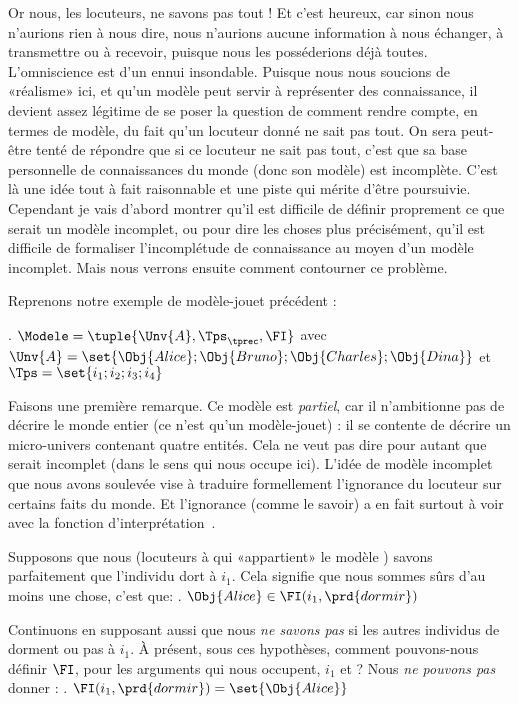 Or nous, les locuteurs, ne savons pas tout !  Et c'est heureux, car
sinon nous n'aurions rien à nous dire, nous n'aurions aucune
information à nous échanger, à transmettre ou à recevoir, puisque nous
les posséderions déjà toutes.  L'omniscience est d'un ennui insondable.
Puisque nous nous soucions de «réalisme» ici, et qu'un modèle peut servir à représenter des connaissance, il devient assez légitime de se poser la question de  comment
rendre compte, en termes de modèle, du fait qu'un locuteur
donné ne sait pas tout.  On sera peut-être tenté de répondre que si
ce locuteur ne sait pas tout, c'est que sa base personnelle de connaissances du
monde (donc son modèle) est incomplète.  C'est là une idée
tout à fait raisonnable et une piste qui mérite d'être poursuivie.
Cependant je vais d'abord montrer qu'il est difficile de définir
proprement ce que serait un modèle incomplet, ou pour dire les choses
plus précisément, qu'il est difficile de formaliser l'incomplétude de
connaissance au moyen d'un modèle incomplet.  Mais nous verrons
ensuite comment contourner ce problème.

Reprenons notre exemple de modèle-jouet précédent : 


\ex.
\(\Modele =
\tuple{\Unv{A},\Tps_{\tprec},\FI}\) avec 
\(\Unv{A} = \set{\Obj{Alice}; \Obj{Bruno}; \Obj{Charles};\Obj{Dina}}\)
et 
 \(\Tps = \set{i_1;i_2;i_3;i_4}\)

Faisons une première remarque.  Ce modèle {\Modele} est
\emph{partiel}, car il n'ambitionne pas de décrire le monde entier (ce
n'est qu'un modèle-jouet) : il se contente de décrire un micro-univers
contenant quatre entités.  Cela ne veut pas dire pour autant que
{\Modele} serait incomplet (dans le sens qui nous occupe ici).
L'idée de modèle incomplet que nous avons soulevée vise à traduire
formellement l'ignorance du locuteur sur certains faits du monde. Et
l'ignorance (comme le savoir) a en fait surtout à voir avec la
fonction d'interprétation~\FI.

Supposons que nous (locuteurs à qui
«appartient» le modèle {\Modele}) savons parfaitement que
l'individu  dort à $i_1$.  Cela signifie que nous sommes
sûrs d'au moins une chose,  c'est que: 
\ex.  
\(\Obj{Alice} \in \FI(i_1,\prd{dormir})\)


Continuons en supposant aussi que nous \emph{ne savons pas} si les autres
individus de {} dorment ou pas à $i_1$.  À présent, sous ces
hypothèses, comment pouvons-nous définir $\FI$, pour les
arguments qui nous occupent, $i_1$ et  ?  Nous \emph{ne
pouvons pas} donner :
\ex.  \label{x:dormiri1}
\(\FI(i_1,\prd{dormir}) = \set{\Obj{Alice}}\)

